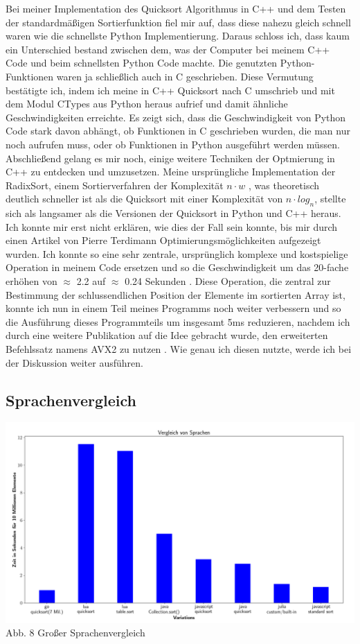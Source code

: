 \documentclass[11pt,a4paper]{article}
\begin{document}
Bei meiner Implementation des Quicksort Algorithmus in C++ und dem Testen der standardmäßigen Sortierfunktion
fiel mir auf, dass diese nahezu gleich schnell waren wie die schnellste Python Implementierung.
Daraus schloss ich, dass kaum ein Unterschied bestand zwischen dem, was der Computer bei meinem C++ Code und beim schnellsten Python Code machte.
Die genutzten Python-Funktionen waren ja schließlich auch in C geschrieben. Diese Vermutung bestätigte ich, indem
ich meine in C++ Quicksort nach C umschrieb und mit dem Modul CTypes aus Python heraus aufrief und damit ähnliche Geschwindigkeiten
erreichte. Es zeigt sich, dass die Geschwindigkeit von Python Code stark davon abhängt, ob Funktionen in C geschrieben wurden,
die man nur noch aufrufen muss, oder ob Funktionen in Python ausgeführt werden müssen.
Abschließend gelang es mir noch, einige weitere Techniken der Optmierung in C++ zu entdecken und umzusetzen.
Meine ursprüngliche Implementation der RadixSort, einem Sortierverfahren der Komplexität $n \cdot w$ , was theoretisch deutlich schneller ist als die Quicksort
mit einer Komplexität von $n \cdot log_{n}$, stellte sich als langsamer als die Versionen  der Quicksort in Python und C++ heraus.
Ich konnte mir erst nicht erklären, wie dies der Fall sein konnte, bis mir durch einen Artikel von Pierre Terdimann Optimierungsmöglichkeiten
aufgezeigt wurden. Ich konnte so eine sehr zentrale, ursprünglich komplexe und kostspielige Operation in meinem Code ersetzen
und so die Geschwindigkeit um das 20-fache erhöhen von $\approx$ 2.2 auf $\approx$ 0.24 Sekunden \cite{terdiman}.
Diese Operation, die zentral zur Bestimmung der schlussendlichen Position der Elemente im sortierten Array ist, konnte ich nun in einem Teil meines Programms noch weiter verbessern und so die Ausführung dieses Programmteils
um insgesamt 5ms reduzieren, nachdem ich durch eine weitere Publikation auf die Idee gebracht wurde, den erweiterten Befehlssatz namens
AVX2 zu nutzen \cite{michael}. Wie genau ich diesen nutzte, werde ich bei der Diskussion weiter ausführen.

\subsection{Sprachenvergleich}

\begin{center}
    \hspace*{-1.5cm}\includegraphics[width=1.2\textwidth]{./diagramme/matplotlib/comparison.png}
    Abb. 8 Großer Sprachenvergleich
\end{center}
\end{document}
